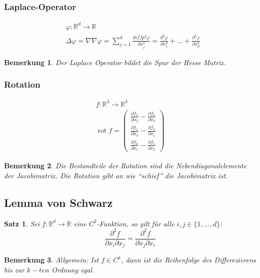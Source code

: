 \documentclass[12pt,a4paper]{article}%
\DeclareMathOperator{\rot}{rot}
\newtheorem{satz}{Satz}[section]
\newtheorem{bem}{Bemerkung}[section]
\numberwithin{equation}{section}
\newcommand{\R}{\mathbb{R}} %
\newcommand{\diffp}{\partial}
\newcommand{\laplace}{\Delta}
\def\dfp#1#2{\frac{\partial #1}{\partial #2}}
\numberwithin{equation}{subsection}
\begin{document}
  \subsubsection{Laplace-Operator}
  \begin{align}
    &\varphi: \R^d \rightarrow \R \nonumber \\
    &\laplace \varphi = \nabla \nabla \varphi= \sum\limits_{j=1}^d \frac{diffp^2 \varphi}{\diffp x_j^2} = \frac{\diffp^2 \varphi}{\diffp x_1^2} + ... + \frac{\diffp^2 \varphi}{\diffp x_d^2}
  \end{align}
  \begin{bem}
   Der Laplace Operator bildet die Spur der Hesse Matrix.
  \end{bem}
  
  \subsubsection{Rotation}
  \begin{align}
    f:\R^3 \rightarrow \R^3 \nonumber \\  
    \rot f = \left( \begin{array}{c}
    \displaystyle\dfp{f_3}{x_2} - \dfp{f_2}{x_3} \\
    \displaystyle\dfp{f_1}{x_3} - \dfp{f_3}{x_1} \\
    \displaystyle\dfp{f_2}{x_1} - \dfp{f_1}{x_2}
    \end{array} \right)
  \end{align}
  \begin{bem}
    Die Bestandteile der Rotation sind die Nebendiagonalelemente der Jacobimatrix. Die Rotation gibt an wie \enquote{schief} die Jacobimatrix ist.
  \end{bem}    

  
  \subsection{Lemma von Schwarz}
  \begin{satz}
    Sei $f: \R^d \rightarrow \R$ eine $C^2$-Funktion, so gilt für alle $i,j \in \lbrace 1, ..., d\rbrace$:
    \begin{equation}
      \frac{\diffp^2 f}{\diffp x_i \diffp x_j} = \frac{\diffp^2 f}{\diffp x_j \diffp x_i}
    \end{equation}
  \end{satz}
  \begin{bem}
    Allgemein: Ist $f \in C^k$, dann ist die Reihenfolge des Differezierens bis zur $k-ten$ Ordnung egal.
  \end{bem}
  
\end{document}
